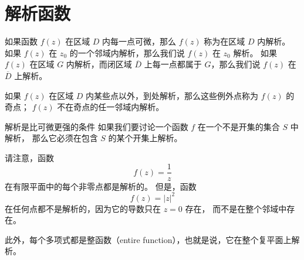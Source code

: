 \documentclass[lang=cn,10pt]{elegantbook}
\begin{document}
\section{解析函数}
\begin{definition}[解析函数]
如果函数 $f(z)$ 在区域 $D$ 内每一点可微，那么 $f(z)$ 称为在区域 $D$ 内解析。  
如果 $f(z)$ 在 $z_0$ 的一个邻域内解析，那么我们说 $f(z)$ 在 $z_0$ 解析。  
如果 $f(z)$ 在区域 $G$ 内解析，而闭区域 $\overline{D}$ 上每一点都属于 $G$，那么我们说 $f(z)$ 在 $\overline{D}$ 上解析。  

如果 $f(z)$ 在区域 $D$ 内某些点以外，到处解析，那么这些例外点称为 $f(z)$ 的奇点；  
$f(z)$ 不在奇点的任一邻域内解析。
\end{definition}
解析是比可微更强的条件
如果我们要讨论一个函数 $f$ 在一个不是开集的集合 $S$ 中解析，
那么它必须在包含 $S$ 的某个开集上解析。

请注意，函数
\[
f(z) = \frac{1}{z}
\]
在有限平面中的每个非零点都是解析的。
但是，函数
\[
f(z) = |z|^2
\]
在任何点都不是解析的，因为它的导数只在 $z=0$ 存在，
而不是在整个邻域中存在。

此外，每个多项式都是整函数（entire function），也就是说，它在整个复平面上解析。
\end{document}
